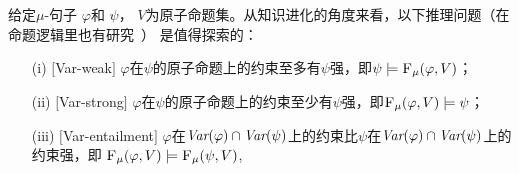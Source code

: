 给定$\mu$-句子 $\varphi$和 $\psi$， $V$为原子命题集。从知识进化的角度来看，以下推理问题（在命题逻辑里也有研究~\cite{wang2015forgetting}） 是值得探索的：

\begin{itemize}
	\item[(i)] $[$Var-weak$]$ $\varphi$在$\psi$的原子命题上的约束至多有$\psi$强，即$\psi\models {\textsc{F}_{\textsc{$\mu$}}}(\varphi, V)$；
	\item[(ii)] $[$Var-strong$]$ $\varphi$在$\psi$的原子命题上的约束至少有$\psi$强，即${\textsc{F}_{\textsc{$\mu$}}}(\varphi, V)\models \psi$；
	\item[(iii)] $[$Var-entailment$]$ $\varphi$在$\textit{Var}(\varphi) \cap \textit{Var}(\psi)$上的约束比$\psi$在$\textit{Var}(\varphi) \cap \textit{Var}(\psi)$上的约束强，即 ${\textsc{F}_{\textsc{$\mu$}}}(\varphi, V) \models {\textsc{F}_{\textsc{$\mu$}}}(\psi, V)$,
\end{itemize}

